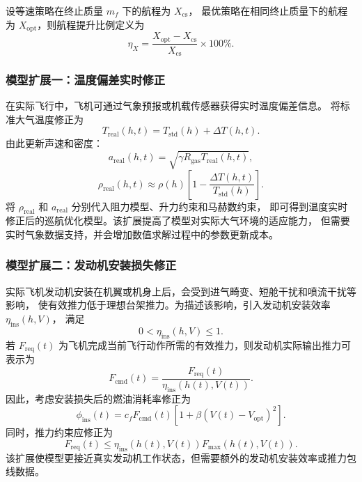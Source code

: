 \documentclass[withoutpreface,bwprint]{cumcmthesis} %
\begin{document}
设等速策略在终止质量 $m_f$ 下的航程为 $X_{\mathrm{cs}}$，
最优策略在相同终止质量下的航程为 $X_{\mathrm{opt}}$，则航程提升比例定义为
\begin{equation}
    \eta_X
    =
    \frac{X_{\mathrm{opt}}-X_{\mathrm{cs}}}{X_{\mathrm{cs}}}\times 100\%.
    \label{eq:q4_range_improvement}
\end{equation}

\subsubsection{模型扩展一：温度偏差实时修正}

在实际飞行中，飞机可通过气象预报或机载传感器获得实时温度偏差信息。
将标准大气温度修正为
\begin{equation}
    T_{\mathrm{real}}(h,t)
    =
    T_{\mathrm{std}}(h)+\Delta T(h,t).
    \label{eq:q4_real_temperature}
\end{equation}
由此更新声速和密度：
\begin{equation}
    a_{\mathrm{real}}(h,t)
    =
    \sqrt{\gamma R_{\mathrm{gas}}T_{\mathrm{real}}(h,t)},
    \label{eq:q4_real_sound}
\end{equation}
\begin{equation}
    \rho_{\mathrm{real}}(h,t)
    \approx
    \rho(h)
    \left[
    1-\frac{\Delta T(h,t)}{T_{\mathrm{std}}(h)}
    \right].
    \label{eq:q4_real_density}
\end{equation}
将 $\rho_{\mathrm{real}}$ 和 $a_{\mathrm{real}}$ 分别代入阻力模型、升力约束和马赫数约束，
即可得到温度实时修正后的巡航优化模型。该扩展提高了模型对实际大气环境的适应能力，
但需要实时气象数据支持，并会增加数值求解过程中的参数更新成本。

\subsubsection{模型扩展二：发动机安装损失修正}

实际飞机发动机安装在机翼或机身上后，会受到进气畸变、短舱干扰和喷流干扰等影响，
使有效推力低于理想台架推力。为描述该影响，引入发动机安装效率 $\eta_{\mathrm{ins}}(h,V)$，
满足
\begin{equation}
    0<\eta_{\mathrm{ins}}(h,V)\leq 1.
    \label{eq:q4_eta_install}
\end{equation}
若 $F_{\mathrm{req}}(t)$ 为飞机完成当前飞行动作所需的有效推力，则发动机实际输出推力可表示为
\begin{equation}
    F_{\mathrm{cmd}}(t)
    =
    \frac{F_{\mathrm{req}}(t)}{\eta_{\mathrm{ins}}(h(t),V(t))}.
    \label{eq:q4_install_thrust}
\end{equation}
因此，考虑安装损失后的燃油消耗率修正为
\begin{equation}
    \phi_{\mathrm{ins}}(t)
    =
    c_fF_{\mathrm{cmd}}(t)
    \left[
    1+\beta\left(V(t)-V_{\mathrm{opt}}\right)^2
    \right].
    \label{eq:q4_install_fuel}
\end{equation}
同时，推力约束应修正为
\begin{equation}
    F_{\mathrm{req}}(t)
    \leq
    \eta_{\mathrm{ins}}(h(t),V(t))F_{\max}(h(t),V(t)).
    \label{eq:q4_install_constraint}
\end{equation}
该扩展使模型更接近真实发动机工作状态，但需要额外的发动机安装效率或推力包线数据。
\end{document}
